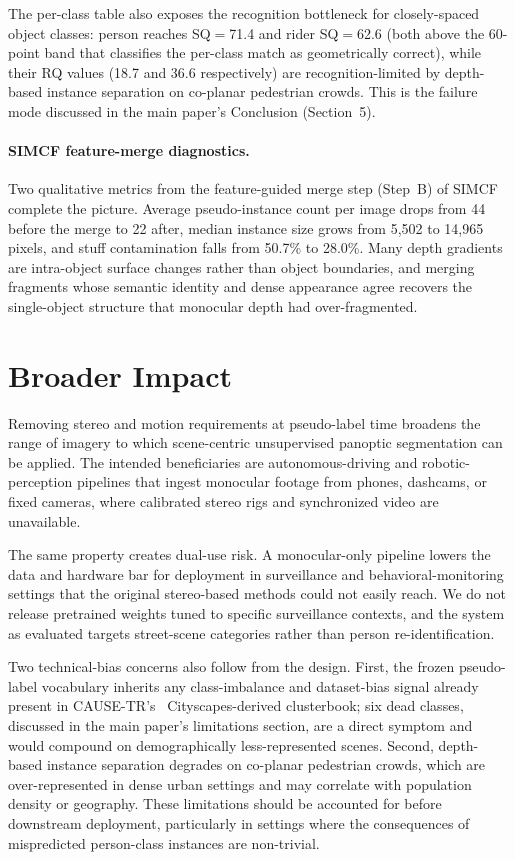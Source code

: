 \documentclass{article}
\begin{document}
The per-class table also exposes the recognition bottleneck for closely-spaced object classes: person reaches SQ$=$71.4 and rider SQ$=$62.6 (both above the 60-point band that classifies the per-class match as geometrically correct), while their RQ values (18.7 and 36.6 respectively) are recognition-limited by depth-based instance separation on co-planar pedestrian crowds. This is the failure mode discussed in the main paper's Conclusion (Section~5).

\paragraph{SIMCF feature-merge diagnostics.}
Two qualitative metrics from the feature-guided merge step (Step~B) of SIMCF complete the picture. Average pseudo-instance count per image drops from 44 before the merge to 22 after, median instance size grows from 5{,}502 to 14{,}965 pixels, and stuff contamination falls from 50.7\% to 28.0\%. Many depth gradients are intra-object surface changes rather than object boundaries, and merging fragments whose semantic identity and dense appearance agree recovers the single-object structure that monocular depth had over-fragmented.

\section{Broader Impact}
\label{sec:impact}

\noindent Removing stereo and motion requirements at pseudo-label time broadens the range of imagery to which scene-centric unsupervised panoptic segmentation can be applied. The intended beneficiaries are autonomous-driving and robotic-perception pipelines that ingest monocular footage from phones, dashcams, or fixed cameras, where calibrated stereo rigs and synchronized video are unavailable.

The same property creates dual-use risk. A monocular-only pipeline lowers the data and hardware bar for deployment in surveillance and behavioral-monitoring settings that the original stereo-based methods could not easily reach. We do not release pretrained weights tuned to specific surveillance contexts, and the system as evaluated targets street-scene categories rather than person re-identification.

Two technical-bias concerns also follow from the design. First, the frozen pseudo-label vocabulary inherits any class-imbalance and dataset-bias signal already present in CAUSE-TR's~\cite{kim2024cause} Cityscapes-derived clusterbook; six dead classes, discussed in the main paper's limitations section, are a direct symptom and would compound on demographically less-represented scenes. Second, depth-based instance separation degrades on co-planar pedestrian crowds, which are over-represented in dense urban settings and may correlate with population density or geography. These limitations should be accounted for before downstream deployment, particularly in settings where the consequences of mispredicted person-class instances are non-trivial.
\end{document}
